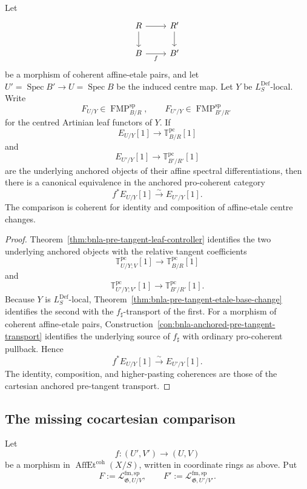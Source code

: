 \begin{proposition}
\label{prop:bnla-centred-artinian-tangent-base-change}
Let
\[
\begin{tikzcd}
R \arrow[r] \arrow[d] & R' \arrow[d]\\
B \arrow[r,"f"'] & B'
\end{tikzcd}
\]
be a morphism of coherent affine-etale pairs, and let
$U'=\operatorname{Spec}B'\to U=\operatorname{Spec}B$ be the induced centre
map.  Let $Y$ be $L^{\mathrm{Def}}_S$-local.  Write
\[
    F_{U/Y}\in\operatorname{FMP}^{\mathrm{sp}}_{B/R},
    \qquad
    F_{U'/Y}\in\operatorname{FMP}^{\mathrm{sp}}_{B'/R'}
\]
for the centred Artinian leaf functors of $Y$.  If
\[
    E_{U/Y}[1]\longrightarrow
    \mathbb T^{\mathrm{pc}}_{B/R}[1]
\]
and
\[
    E_{U'/Y}[1]\longrightarrow
    \mathbb T^{\mathrm{pc}}_{B'/R'}[1]
\]
are the underlying anchored objects of their affine spectral
differentiations, then there is a canonical equivalence in the anchored
pro-coherent category
\[
\boxed{
    f^*E_{U/Y}[1]
    \xrightarrow{\sim}
    E_{U'/Y}[1].}
\]
The comparison is coherent for identity and composition of affine-etale
centre changes.
\end{proposition}

\begin{proof}
Theorem~\ref{thm:bnla-pre-tangent-leaf-controller} identifies the two
underlying anchored objects with the relative tangent coefficients
\[
    \mathbb T^{\mathrm{pc}}_{U/Y;V}[1]
    \longrightarrow
    \mathbb T^{\mathrm{pc}}_{B/R}[1]
\]
and
\[
    \mathbb T^{\mathrm{pc}}_{U'/Y;V'}[1]
    \longrightarrow
    \mathbb T^{\mathrm{pc}}_{B'/R'}[1].
\]
Because $Y$ is $L^{\mathrm{Def}}_S$-local,
Theorem~\ref{thm:bnla-pre-tangent-etale-base-change} identifies the second
with the $f_\sharp$-transport of the first.  For a morphism of coherent
affine-etale pairs,
Construction~\ref{con:bnla-anchored-pre-tangent-transport} identifies the
underlying source of $f_\sharp$ with ordinary pro-coherent pullback.  Hence
\[
    f^*E_{U/Y}[1]
    \xrightarrow{\sim}
    E_{U'/Y}[1].
\]
The identity, composition, and higher-pasting coherences are those of the
cartesian anchored pre-tangent transport.
\end{proof}

\subsection{The missing cocartesian comparison}

Let
\[
    f:(U',V')\longrightarrow(U,V)
\]
be a morphism in
$\operatorname{AffEt}^{\mathrm{coh}}(X/S)$, written in coordinate rings as
above.  Put
\[
    F:=\mathcal L^{\mathrm{fm,sp}}_{\mathfrak G,U/V},
    \qquad
    F':=\mathcal L^{\mathrm{fm,sp}}_{\mathfrak G,U'/V'}.
\]

